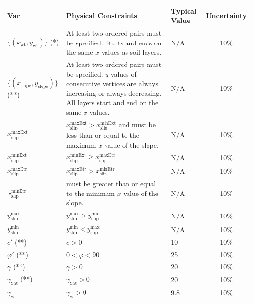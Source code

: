 \documentclass[12pt]{article}
\renewcommand{\arraystretch}{1}
\begin{document}
\begin{table}[!h]
\caption{Input Variables} 
\renewcommand{\arraystretch}{1.5}
\noindent \begin{longtable*}{p{3.1cm} p{5.1cm} p{1.2cm} c}
  \toprule  \label{TblInputVar}
  \textbf{Var} & \textbf{Physical Constraints} & \textbf{Typical
    Value} & \textbf{Uncertainty}\\ \midrule
  $\{(x_{\text{wt}},y_{\text{wt}})\}$ (*) & At least two ordered pairs must be 
  specified. 
  Starts and ends on the same $x$ values as soil layers.  
  & N/A & 10\% \\
  $\{(x_{\text{slope}},y_{\text{slope}})\}$ (**) & At least two ordered pairs 
  must be 
  specified. 
  $y$ values of consecutive vertices are always increasing or always 
  decreasing. All layers start and end on the same $x$ values. & N/A & 10\% \\
  ${x_{\text{slip}}^{\text{maxExt}}}$ & ${x_{\text{slip}}^{\text{maxExt}}} > 
  {x_{\text{slip}}^{\text{minExt}}}$ and must 
  be less than or equal to the maximum $x$ value of the slope. & N/A & 10\% \\
  ${x_{\text{slip}}^{\text{minExt}}}$ & ${x_{\text{slip}}^{\text{minExt}}} \geq 
  {x_{\text{slip}}^{\text{maxEtr}}}$ & 
  N/A & 
  10\% \\
  ${x_{\text{slip}}^{\text{maxEtr}}}$ & ${x_{\text{slip}}^{\text{maxEtr}}} > 
  {x_{\text{slip}}^{\text{minEtr}}}$ & 
  N/A & 10\% \\
  ${x_{\text{slip}}^{\text{minEtr}}}$ & must be greater than or equal to the 
  minimum 
  $x$ 
  value of the 
  slope. & N/A & 10\% \\
  ${y_{\text{slip}}^{\text{max}}}$ & ${y_{\text{slip}}^{\text{max}}} > 
  {y_{\text{slip}}^{\text{min}}}$ & N/A & 10\% \\
  ${y_{\text{slip}}^{\text{min}}}$ & ${y_{\text{slip}}^{\text{min}}} < 
  {y_{\text{slip}}^{\text{max}}}$ & N/A & 10\% \\
  $c'$ (**) & $c >0$ & 10 & 10\%\\
  $\varphi'$ (**) & $ 0 < \varphi < 90 $ & 25 & 10\% \\
  $\gamma$ (**) & $\gamma > 0$ & 20 & 10\% \\
  $\gamma_{\text{Sat}}$ (**) & $\gamma_{\text{Sat}} > 0 $ & 20 & 10\% \\
  $\gamma_{\text{w}}$ & $\gamma_{\text{w}} > 0 $ & 9.8 & 10\% \\
  \bottomrule
\end{longtable*}
\end{table}
\end{document}
